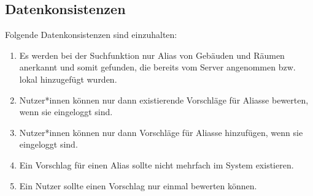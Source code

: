 \subsection{Datenkonsistenzen}

Folgende Datenkonsistenzen sind einzuhalten:
\begin{enumerate}[label=\textbf{/T\arabic*0/}, align=left, resume]
	\item Es werden bei der Suchfunktion nur Alias von Gebäuden und Räumen anerkannt und somit gefunden, die bereits vom Server angenommen bzw. lokal hinzugefügt wurden.
	\item Nutzer*innen können nur dann existierende Vorschläge für Aliasse bewerten, wenn sie eingeloggt sind.
	\item Nutzer*innen können nur dann Vorschläge für Aliasse hinzufügen, wenn sie eingeloggt sind.
	\item Ein Vorschlag für einen Alias sollte nicht mehrfach im System existieren.
	\item Ein Nutzer sollte einen Vorschlag nur einmal bewerten können.
\end{enumerate}
